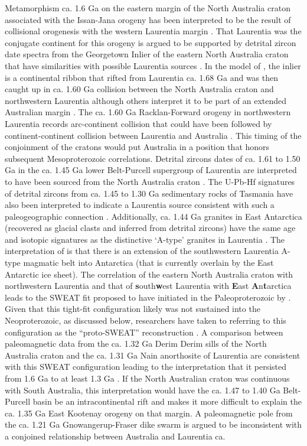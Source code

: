 \documentclass[twocolumn, switch]{article} %
\begin{document}
Metamorphism ca. 1.6 Ga on the eastern margin of the North Australia craton associated with the Issan-Jana orogeny has been interpreted to be the  result of collisional orogenesis with the western Laurentia margin \citep{Nordsvan2018a, Pourteau2018a, Gibson2020a}. That Laurentia was the conjugate continent for this orogeny is argued to be supported by detrital zircon date spectra from the Georgetown Inlier of the eastern North Australia craton that have similarities with possible Laurentia sources \citep{Nordsvan2018a}. In the model of \cite{Nordsvan2018a}, the inlier is a continental ribbon that rifted from Laurentia ca. 1.68 Ga and was then caught up in ca. 1.60 Ga collision between the North Australia craton and northwestern Laurentia although others interpret it to be part of an extended Australian margin \citep{Gibson2020a}. The ca. 1.60 Ga Racklan-Forward orogeny in northwestern Laurentia records arc-continent collision that could have been followed by continent-continent collision between Laurentia and Australia \citep{Thorkelson2005a, Furlanetto2013a}. This timing of the conjoinment of the cratons would put Australia in a position that honors subsequent Mesoproterozoic correlations. Detrital zircons dates of ca. 1.61 to 1.50 Ga in the ca. 1.45 Ga lower Belt-Purcell supergroup of Laurentia are interpreted to have been sourced from the North Australia craton \citep{Jones2015a}. The U-Pb-Hf signatures of detrital zircons from ca. 1.45 to 1.30 Ga sedimentary rocks of Tasmania have also been interpreted to indicate a Laurentia source consistent with such a paleogeographic connection \citep{Mulder2015a}. Additionally, ca. 1.44 Ga granites in East Antarctica (recovered as glacial clasts and inferred from detrital zircons) have the same age and isotopic signatures as the distinctive `A-type' granites in Laurentia \citep{Goodge2008a}. The interpretation of \cite{Goodge2008a, Goodge2017a} is that there is an extension of the southwestern Laurentia A-type magmatic belt into Antarctica (that is currently overlain by the East Antarctic ice sheet). The correlation of the eastern North Australia craton with northwestern Laurentia and that of \textbf{s}outh\textbf{w}est Laurentia with \textbf{E}ast \textbf{A}n\textbf{t}arctica leads to the SWEAT fit proposed to have initiated in the Paleoproterozoic by \cite{Moores1991a}. Given that this tight-fit configuration likely was not sustained into the Neoproterozoic, as discussed below, researchers have taken to referring to this configuration as  the ``proto-SWEAT'' reconstruction \citep{Payne2009b, Kirscher2020a}. A comparison between paleomagnetic data from the ca. 1.32 Ga Derim Derim sills of the North Australia craton and the ca. 1.31 Ga Nain anorthosite of Laurentia are consistent with this SWEAT configuration leading to the interpretation that it persisted from 1.6 Ga to at least 1.3 Ga \citep{Kirscher2020a}. If the North Australian craton was continuous with South Australia, this interpretation would have the ca. 1.47 to 1.40 Ga Belt-Purcell basin be an intracontinental rift and makes it more difficult to explain the ca. 1.35 Ga East Kootenay orogeny on that margin. A paleomagnetic pole from the ca. 1.21 Ga Gnowangerup-Fraser dike swarm is argued to be inconsistent with a conjoined relationship between Australia and Laurentia ca. 
\end{document}
